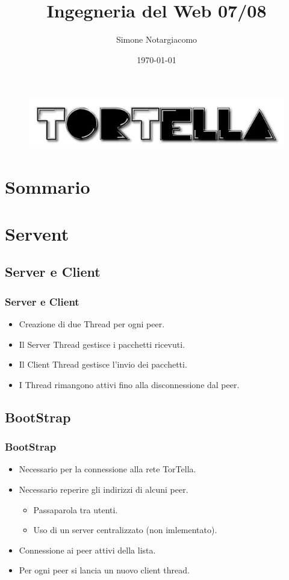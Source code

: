 \documentclass[a4paper,italian,12pt]{beamer}
\title{Ingegneria del Web 07/08}
\institute{Università di Roma Tor Vergata}
\author{Simone Notargiacomo}
\date{\today}
\begin{document}
	\begin{frame}
		\titlepage
		\begin{figure}[H]
			\begin{center}
				\includegraphics[scale=0.4]{etc/tortellalogo.jpg}
			\end{center}
		\end{figure}
	\end{frame}

    \section{Sommario}
	    \frame{\tableofcontents}

    \section{Servent}
    	\subsection{Server e Client}
			\frame
    		{
   				\frametitle{Server e Client}
    			\begin{itemize}	
	   				\item Creazione di due Thread per ogni peer.
					\item Il Server Thread gestisce i pacchetti ricevuti.
					\item Il Client Thread gestisce l'invio dei pacchetti.
					\item I Thread rimangono attivi fino alla disconnessione dal peer.
				\end{itemize}
   			}
   		\subsection{BootStrap}
   			\frame
	   		{
	   			\frametitle{BootStrap}
	   			\begin{itemize}
	   				\item Necessario per la connessione alla rete TorTella.
	   				\item Necessario reperire gli indirizzi di alcuni peer.
	   					\begin{itemize}
	   						\item Passaparola tra utenti.
	   						\item Uso di un server centralizzato (non imlementato).
	   					\end{itemize}
	   				\item Connessione ai peer attivi della lista.
	   				\item Per ogni peer si lancia un nuovo client thread.
	   			\end{itemize}
	   		}
\end{document}
